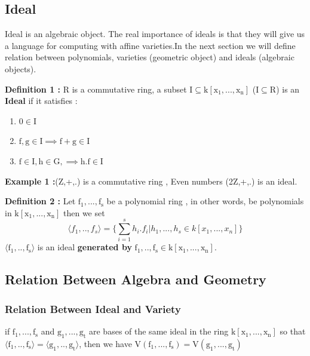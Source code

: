 \documentclass[11pt]{article}
\begin{document}
\subsection{Ideal}
Ideal is an algebraic object. The real importance of ideals is that they will give us a language for computing with affine varieties.In the next section we will define relation between polynomials, varieties (geometric object) and ideals (algebraic objects).\newline

\textbf{Definition 1 :}\newline
R is a commutative ring, a subset $\mathrm{ I \subseteq k[x_1,...,x_n] }$ ($\mathrm{ I \subseteq R }$) is an \textbf{Ideal} if it satisfies :
\begin{enumerate}
\item $\mathrm{0 \in I}$
\item $\mathrm{f,g \in I \implies f+g \in I}$
\item $\mathrm{f \in I, h \in G,\implies h.f \in I  }$
\end{enumerate}

\textbf{Example 1 :}\newline  (Z,+,.) is a commutative ring , Even numbers (2Z,+,.) is an ideal.\newline


\textbf{Definition 2 :}\newline
Let $\mathrm{ f_1,...,f_s }$ be a polynomial ring , in other words, be polynomials in  $\mathrm{ k[x_1,...,x_n] }$  then we set
\begin{equation}
  \langle f_1,..,f_s \rangle= \bigg\{ \sum_{i=1}^{s}{h_i.f_i}| h_1,...,h_s \in k[x_1,...,x_n] \bigg\}
\end{equation}
$\mathrm{ \langle f_1,..,f_s \rangle  }$ is an ideal \textbf{generated by} $\mathrm{f_1,..,f_s \in k[x_1,...,x_n]}$. \newline


\subsection{Relation Between Algebra and Geometry}
\subsubsection{Relation Between Ideal and Variety}
if $\mathrm{ f_1,...,f_s }$ and $\mathrm{ g_1,...,g_t }$ are bases of the same ideal in the ring $\mathrm{k[x_1,...,x_n] }$ so that $\mathrm{ \langle f_1,..,f_s \rangle = \langle g_1,..,g_t \rangle }$, then we have  $\mathrm{V(f_1,...,f_s)=V(g_1,...,g_t) }$ \newline
\end{document}
